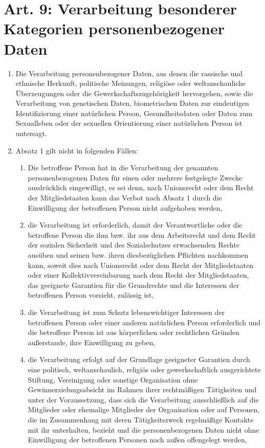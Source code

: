 \documentclass[A4, 12pt]{scrbook}
\begin{document}
    \section[Art 9: Verarbeitung besonderer Daten]{Art. 9: Verarbeitung besonderer Kategorien personenbezogener Daten}
        \begin{enumerate}
            \item Die Verarbeitung personenbezogener Daten, aus denen die rassische und ethnische Herkunft, politische Meinungen, religiöse oder weltanschauliche Überzeugungen oder die Gewerkschaftszugehörigkeit hervorgehen, sowie die Verarbeitung von genetischen Daten, biometrischen Daten zur eindeutigen Identifizierung einer natürlichen Person, Gesundheitsdaten oder Daten zum Sexualleben oder der sexuellen Orientierung einer natürlichen Person ist untersagt.
            \item Absatz 1 gilt nicht in folgenden Fällen:
                \begin{enumerate}[label=\alph*)]
                    \item Die betroffene Person hat in die Verarbeitung der genannten personenbezogenen Daten für einen oder mehrere festgelegte Zwecke ausdrücklich eingewilligt, es sei denn, nach Unionsrecht oder dem Recht der Mitgliedstaaten kann das Verbot nach Absatz 1 durch die Einwilligung der betroffenen Person nicht aufgehoben werden,
                    \item die Verarbeitung ist erforderlich, damit der Verantwortliche oder die betroffene Person die ihm bzw. ihr aus dem Arbeitsrecht und dem Recht der sozialen Sicherheit und des Sozialschutzes erwachsenden Rechte ausüben und seinen bzw. ihren diesbezüglichen Pflichten nachkommen kann, soweit dies nach Unionsrecht oder dem Recht der Mitgliedstaaten oder einer Kollektivvereinbarung nach dem Recht der Mitgliedstaaten, das geeignete Garantien für die Grundrechte und die Interessen der betroffenen Person vorsieht, zulässig ist,
                    \item die Verarbeitung ist zum Schutz lebenswichtiger Interessen der betroffenen Person oder einer anderen natürlichen Person erforderlich und die betroffene Person ist aus körperlichen oder rechtlichen Gründen außerstande, ihre Einwilligung zu geben, 
                    \item die Verarbeitung erfolgt auf der Grundlage geeigneter Garantien durch eine politisch, weltanschaulich, religiös oder gewerkschaftlich ausgerichtete Stiftung, Vereinigung oder sonstige Organisation ohne Gewinnerzielungsabsicht im Rahmen ihrer rechtmäßigen Tätigkeiten und unter der Voraussetzung, dass sich die Verarbeitung ausschließlich auf die Mitglieder oder ehemalige Mitglieder der Organisation oder auf Personen, die im Zusammenhang mit deren Tätigkeitszweck regelmäßige Kontakte mit ihr unterhalten, bezieht und die personenbezogenen Daten nicht ohne Einwilligung der betroffenen Personen nach außen offengelegt werden,

\end{enumerate}
\end{enumerate}
\end{document}
